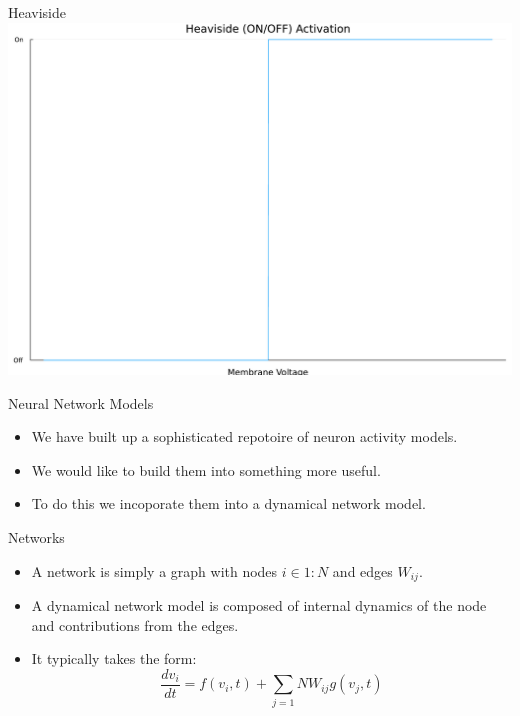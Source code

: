 \documentclass[
  ignorenonframetext,
]{beamer}
\begin{document}
\begin{frame}{Heaviside}
\protect\hypertarget{heaviside}{}
\includegraphics{lecture2_files/figure-beamer/cell-9-output-1.pdf}
\end{frame}

\begin{frame}{Neural Network Models}
\protect\hypertarget{neural-network-models}{}
\begin{itemize}
\item
  We have built up a sophisticated repotoire of neuron activity models.
\item
  We would like to build them into something more useful.
\item
  To do this we incoporate them into a dynamical network model.
\end{itemize}
\end{frame}

\begin{frame}{Networks}
\protect\hypertarget{networks-1}{}
\begin{itemize}
\item
  A network is simply a graph with nodes \(i \in 1:N\) and edges
  \(W_{ij}\).
\item
  A dynamical network model is composed of internal dynamics of the node
  and contributions from the edges.
\item
  It typically takes the form:
  \[\frac{dv_i}{dt} = f(v_i, t) + \sum_{j=1}{N} W_{ij} g(v_j, t) \]
\end{itemize}
\end{frame}
\end{document}

